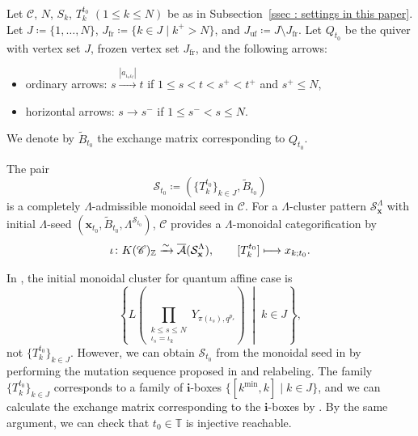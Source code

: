 Let $\mathscr{C}$, $N$, $S_k$, $T_k^{t_0}$ $(1 \leq k \leq N)$
be as in Subsection~\ref{ssec : settings in this paper}.
Let $J \coloneq \{1, \ldots, N\}$,
$J_{\mathrm{fr}} \coloneq \{k \in J \mid k^+ > N\}$,
and $J_{\mathrm{uf}} \coloneq J \setminus J_{\mathrm{fr}}$.
Let $Q_{t_0}$ be the quiver with vertex set $J$,
frozen vertex set $J_{\mathrm{fr}}$, and the following arrows:
\begin{itemize}
    \item ordinary arrows:
    $s \xrightarrow{|a_{\iota_s\iota_t}|} t$
    if $1 \leq s < t < s^+ < t^+$ and $s^+ \leq N$,
    \item horizontal arrows:
    $s \longrightarrow s^-$
    if $1 \leq s^- < s \leq N$.
\end{itemize}
We denote by $\widetilde{B}_{t_0}$
the exchange matrix corresponding to $Q_{t_0}$.

\begin{Thm}
\label{Thm : Lambda monoidal categorification}
The pair
\[
\mathscr{S}_{t_0}
\coloneq (\{T_k^{t_0}\}_{k \in J}, \widetilde{B}_{t_0})
\]
is a completely $\Lambda$-admissible monoidal seed in $\mathscr{C}$.
For a $\Lambda$-cluster pattern $\mathcal{S}_{\mathbf{x}}^{\Lambda}$
with initial $\Lambda$-seed
$(\mathbf{x}_{t_0}, \widetilde{B}_{t_0},
\Lambda^{\mathscr{S}_{t_0}})$,
$\mathscr{C}$ provides a $\Lambda$-monoidal categorification by
\[
\iota \colon K(\mathscr{C})_{\mathbb{Z}}
\xrightarrow{\sim}
\overline{\mathcal{A}}(\mathcal{S}_{\mathbf{x}}^{\Lambda}),
\qquad
[T_k^{t_0}] \longmapsto x_{k;t_0}.
\]
\end{Thm}

\begin{Rem}
\label{Rem : initial monoidal clusters and i boxes}
In \cite[Theorem 7.20]{KKOP24}, the initial monoidal cluster for quantum affine case is
\[
\left\{
L\left(\prod_{\substack{k \leq s \leq N \\ \iota_s = \iota_k}}
Y_{\pi(\iota_s), q^{p_s}}\right)
\;\middle|\; k \in J
\right\},
\]
not $\{T_k^{t_0}\}_{k \in J}$.
However, we can obtain $\mathscr{S}_{t_0}$
from the monoidal seed in \cite[Theorem 7.20]{KKOP24}
by performing the mutation sequence
proposed in \cite[$\S$13]{GLSKac} and relabeling.
The family $\{T_k^{t_0}\}_{k \in J}$ corresponds to
a family of $\mathbf{i}$-boxes
$\{[k^{\min}, k] \mid k \in J\}$,
and we can calculate the exchange matrix
corresponding to the $\mathbf{i}$-boxes by \cite{KK26}. 
By the same argument, we can check that $t_0 \in \mathbb{T}$ is injective reachable. 
\end{Rem}

